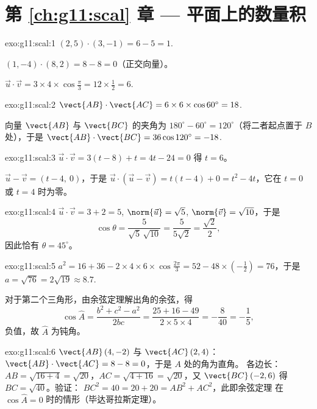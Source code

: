 \section*{第 \ref{ch:g11:scal} 章 --- 平面上的数量积}

\begin{solution}{exo:g11:scal:1}
$(2,5)\cdot(3,-1) = 6 - 5 = 1$.

$(1,-4)\cdot(8,2) = 8 - 8 = 0$（正交向量）。

$\vec u\cdot\vec v = 3 \times 4 \times \cos\frac\pi3 = 12 \times \frac12
= 6$.
\end{solution}

\begin{solution}{exo:g11:scal:2}
$\vect{AB}\cdot\vect{AC} = 6 \times 6 \times \cos 60^\circ = 18$.

向量 $\vect{AB}$ 与 $\vect{BC}$ 的夹角为
$180^\circ - 60^\circ = 120^\circ$（将二者起点置于 $B$ 处），于是
$\vect{AB}\cdot\vect{BC} = 36 \cos 120^\circ = -18$.
\end{solution}

\begin{solution}{exo:g11:scal:3}
$\vec u \cdot \vec v = 3(t - 8) + t = 4t - 24 = 0$ 得 $t = 6$。

$\vec u - \vec v = (t - 4,\ 0)$，于是
$\vec u \cdot (\vec u - \vec v) = t(t-4) + 0 = t^2 - 4t$，它在
$t = 0$ 或 $t = 4$ 时为零。
\end{solution}

\begin{solution}{exo:g11:scal:4}
$\vec u \cdot \vec v = 3 + 2 = 5$, $\norm{\vec u} = \sqrt5$,
$\norm{\vec v} = \sqrt{10}$，于是
\[
\cos\theta = \frac{5}{\sqrt5\,\sqrt{10}} = \frac{5}{5\sqrt2}
= \frac{\sqrt2}{2},
\]
因此恰有 $\theta = 45^\circ$。
\end{solution}

\begin{solution}{exo:g11:scal:5}
$a^2 = 16 + 36 - 2 \times 4 \times 6 \times \cos\frac{2\pi}{3}
= 52 - 48 \times \left(-\frac12\right) = 76$，于是 $a = \sqrt{76} =
2\sqrt{19} \approx 8.7$.

对于第二个三角形，由余弦定理解出角的余弦，得
\[
\cos\widehat A = \frac{b^2 + c^2 - a^2}{2bc}
= \frac{25 + 16 - 49}{2 \times 5 \times 4} = -\frac{8}{40} = -\frac15,
\]
负值，故 $\widehat A$ 为钝角。
\end{solution}

\begin{solution}{exo:g11:scal:6}
$\vect{AB}\,(4, -2)$ 与 $\vect{AC}\,(2, 4)$：
$\vect{AB}\cdot\vect{AC} = 8 - 8 = 0$，于是 $A$ 处的角为直角。
各边长：$AB = \sqrt{16 + 4} = \sqrt{20}$，$AC = \sqrt{4 + 16} =
\sqrt{20}$，又 $\vect{BC}\,(-2, 6)$ 得 $BC = \sqrt{40}$。验证：
$BC^2 = 40 = 20 + 20 = AB^2 + AC^2$，此即余弦定理
在 $\cos\widehat A = 0$ 时的情形（毕达哥拉斯定理）。
\end{solution}

